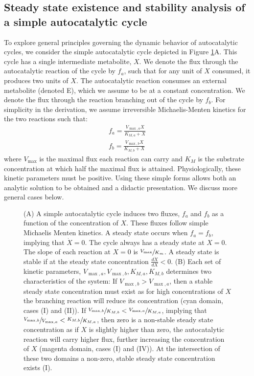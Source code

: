 \subsection{Steady state existence and stability analysis of a simple autocatalytic cycle}
To explore general principles governing the dynamic behavior of autocatalytic cycles, we consider the simple autocatalytic cycle depicted in Figure \ref{fig:simplecycle}A.
This cycle has a single intermediate metabolite, $X$.
We denote the flux through the autocatalytic reaction of the cycle by $f_a$, such that for any unit of $X$ consumed, it produces two units of $X$.
The autocatalytic reaction consumes an external metabolite (denoted E), which we assume to be at a constant concentration.
We denote the flux through the reaction branching out of the cycle by $f_b$.
For simplicity in the derivation, we assume irreversible Michaelis-Menten kinetics for the two reactions such that:
    \begin{eqnarray*}
      f_a = \frac{V_{\max,a}X}{K_{M,a}+X} \\
      f_b = \frac{V_{\max,b}X}{K_{M,b}+X}
    \end{eqnarray*}
    where $V_{\max}$ is the maximal flux each reaction can carry and $K_M$ is the substrate concentration at which half the maximal flux is attained.
    Physiologically, these kinetic parameters must be positive.
    Using these simple forms allows both an analytic solution to be obtained and a didactic presentation.
    We discuss more general cases below.
    \begin{figure}[h!]
      
      \caption{\label{fig:simplecycle}
        (A) A simple autocatalytic cycle induces two fluxes, $f_a$ and $f_b$ as a function of the concentration of $X$.
        These fluxes follow simple Michaelis Menten kinetics.
        A steady state occurs when $f_a=f_b$, implying that $\dot{X}=0$.
        The cycle always has a steady state at $X=0$.
        The slope of each reaction at $X=0$ is $\sfrac{V_{\max}}{K_m}$.
        A steady state is stable if at the steady state concentration $\frac{d\dot{X}}{dX}<0$.
        (B) Each set of kinetic parameters, $V_{\max,a},V_{\max,b},K_{M,a},K_{M,b}$ determines two characteristics of the system: 
        If $V_{\max,b}>V_{\max,a}$, then a stable steady state concentration must exist as for high concentrations of $X$ the branching reaction will reduce its concentration (cyan domain, cases (I) and (II)).
        If $\sfrac{V_{\max,b}}{K_{M,b}}<\sfrac{V_{\max,a}}{K_{M,a}}$, implying that $\sfrac{V_{\max,b}}{V_{\max,a}}<\sfrac{K_{M,b}}{K_{M,a}}$, then zero is a non-stable steady state concentration as if $X$ is slightly higher than zero, the autocatalytic reaction will carry higher flux, further increasing the concentration of $X$ (magenta domain, cases (I) and (IV)).
    At the intersection of these two domains a non-zero, stable steady state concentration exists (I).}
    \end{figure}

